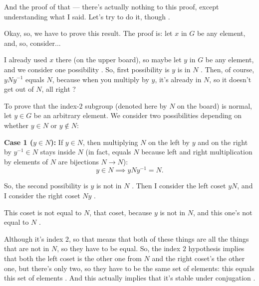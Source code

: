 \begin{proofWrapper}

\begin{speech}[00:11:05 - 00:12:01]
And the proof of that --- there's actually nothing to this proof, except understanding what I said. Let's try to do it, though .

Okay, so, we have to prove this result. The proof is: let $x$ in $G$ be any element, and, so, consider... 

I already used $x$ there (on the upper board), so maybe let $y$ in $G$ be any element, and we consider one possibility . So, first possibility is $y$ is in $N$ . Then, of course, $y N y^{-1}$ equals $N$, because when you multiply by $y$, it's already in $N$, so it doesn't get out of $N$, all right ?
\end{speech}

\begin{content}
To prove that the index-$2$ subgroup (denoted here by $N$ on the board) is normal, let $y \in G$ be an arbitrary element. We consider two possibilities depending on whether $y \in N$ or $y \notin N$:

\textbf{Case 1 ($y \in N$):} If $y \in N$, then multiplying $N$ on the left by $y$ and on the right by $y^{-1} \in N$ stays inside $N$ (in fact, equals $N$ because left and right multiplication by elements of $N$ are bijections $N \to N$):
\[
y \in N \implies y N y^{-1} = N.
\]
\end{content}

\begin{speech}[00:12:01 - 00:13:20]
So, the second possibility is $y$ is not in $N$ . Then I consider the left coset $yN$, and I consider the right coset $Ny$ .

This coset is not equal to $N$, that coset, because $y$ is not in $N$, and this one's not equal to $N$ .

Although it's index $2$, so that means that both of these things are all the things that are not in $N$, so they have to be equal. So, the index $2$ hypothesis implies that both the left coset is the other one from $N$ and the right coset's the other one, but there's only two, so they have to be the same set of elements: this equals this set of elements . And this actually implies that it's stable under conjugation .


\end{speech}
\end{proofWrapper}
